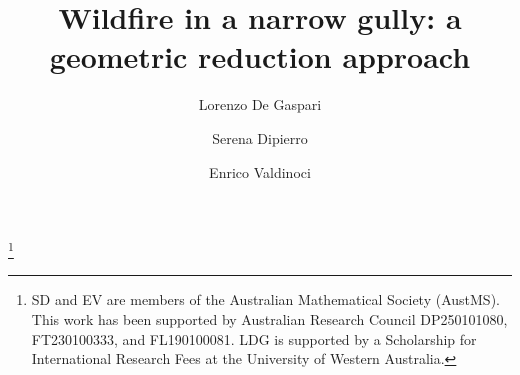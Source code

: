 \documentclass[12pt,a4paper]{amsart}
\numberwithin{equation}{section}
\theoremstyle{definition}
\theoremstyle{remark}
\begin{document}
\title[Wildfire in a narrow gully]{Wildfire in a narrow gully: a geometric reduction approach}
\author[L. De Gaspari]{Lorenzo De Gaspari}
\address{L. D. G., 
Department of Mathematics and Statistics,
University of Western Australia,
35~Stirling Highway, WA 6009 Crawley, Australia. }


\author[S. Dipierro]{Serena Dipierro}
\address{S. D., 
Department of Mathematics and Statistics,
University of Western Australia,
35~Stirling Highway, WA 6009 Crawley, Australia. }


\author[E. Valdinoci]{Enrico Valdinoci}
\address{E. V., 
Department of Mathematics and Statistics,
University of Western Australia,
35~Stirling Highway, WA 6009 Crawley, Australia. }


\thanks{SD and EV are members of the Australian Mathematical Society (AustMS). This work has been supported by Australian Research Council DP250101080, FT230100333, and FL190100081. LDG is supported by a Scholarship for International Research
Fees at the University of Western Australia.}


\end{document}
